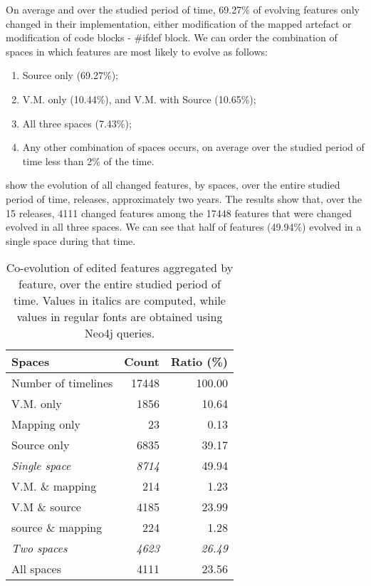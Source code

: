 On average and over the studied period of time, 69.27\% of evolving features only changed in their implementation, either modification of the mapped artefact or modification of code blocks - \#ifdef block.
We can order the combination of spaces in which features are most likely to evolve as follows:
\begin{enumerate}
\item Source only (69.27\%);
\item V.M. only (10.44\%), and V.M. with Source (10.65\%);
\item All three spaces (7.43\%);
\item Any other combination of spaces occurs, on average over the studied period of time less than 2\% of the time.
\end{enumerate}

 show the evolution of all changed features, by spaces, over the entire studied period of time,  releases, approximately two years.
The results show that, over the 15 releases, 4111 changed features among the 17448 features that were changed evolved in all three spaces. 
We can see that half of features (49.94\%) evolved in a single space during that time.

\begin{table}[h]
\centering
\begin{adjustbox}{max width=\textwidth}
\centering
\begin{tabular}{|l|r|r|}
\hline
Spaces	 			 & Count & Ratio (\%)\\
\hline
Number of timelines		& 17448	& 100.00 \\
\hline
V.M. only				&1856	&10.64	\\
Mapping only 			&23		&0.13	\\
Source only 				&6835	& 39.17		\\

\emph{Single space}		&\emph{8714}	& 49.94	\\
\hline
V.M. \& mapping 			&214		&1.23		\\
V.M \&  source			&4185	&23.99		\\
source \& mapping		&224		&1.28		\\
\emph{Two spaces}		&\emph{4623}		&\emph{26.49}	\\
\hline
All spaces 				&4111		& 23.56\\
\hline
\end{tabular}
\end{adjustbox}
\caption{Co-evolution of edited features aggregated by feature, over the entire studied period of time. Values in italics are computed, while values in regular fonts are obtained using Neo4j queries.}
\label{feature_evolution_aggregated}
\end{table}

